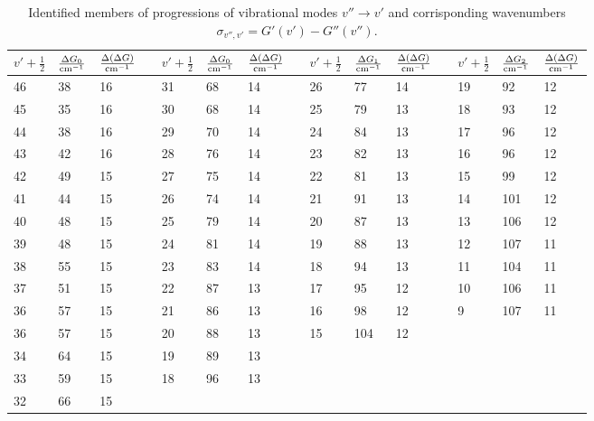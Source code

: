\begin{table}[h]
\centering
\footnotesize
\begin{tabular}{|l |l |l ||c|
                 l |l |l ||c|
                 l |l |l ||c|
                 l |l |l |}
\hline
$v' + \frac{1}{2}$ & $\frac{\Delta G_{0} }{ \mathrm{cm^{-1}}} $ & $\frac{\Delta (\Delta G) }{ \mathrm{cm^{-1}}} $&&
$v' + \frac{1}{2}$ & $\frac{\Delta G_{0} }{ \mathrm{cm^{-1}}} $ & $\frac{\Delta (\Delta G) }{ \mathrm{cm^{-1}}} $&&
$v' + \frac{1}{2}$ & $\frac{\Delta G_{1} }{ \mathrm{cm^{-1}}} $ & $\frac{\Delta (\Delta G) }{ \mathrm{cm^{-1}}} $&&
$v' + \frac{1}{2}$ & $\frac{\Delta G_{2} }{ \mathrm{cm^{-1}}} $ & $\frac{\Delta (\Delta G) }{ \mathrm{cm^{-1}}} $\\ \hline
46 & 38 & 16 & & 31 & 68 & 14 & & 26 & 77 & 14 & & 19 & 92 & 12 \\ \hline
45 & 35 & 16 & & 30 & 68 & 14 & & 25 & 79 & 13 & & 18 & 93 & 12 \\ \hline
44 & 38 & 16 & & 29 & 70 & 14 & & 24 & 84 & 13 & & 17 & 96 & 12 \\ \hline
43 & 42 & 16 & & 28 & 76 & 14 & & 23 & 82 & 13 & & 16 & 96 & 12 \\ \hline
42 & 49 & 15 & & 27 & 75 & 14 & & 22 & 81 & 13 & & 15 & 99 & 12 \\ \hline
41 & 44 & 15 & & 26 & 74 & 14 & & 21 & 91 & 13 & & 14 & 101 & 12 \\ \hline
40 & 48 & 15 & & 25 & 79 & 14 & & 20 & 87 & 13 & & 13 & 106 & 12 \\ \hline
39 & 48 & 15 & & 24 & 81 & 14 & & 19 & 88 & 13 & & 12 & 107 & 11 \\ \hline
38 & 55 & 15 & & 23 & 83 & 14 & & 18 & 94 & 13 & & 11 & 104 & 11 \\ \hline
37 & 51 & 15 & & 22 & 87 & 13 & & 17 & 95 & 12 & & 10 & 106 & 11 \\ \hline
36 & 57 & 15 & & 21 & 86 & 13 & & 16 & 98 & 12 & & 9 & 107 & 11 \\ \hline
36 & 57 & 15 & & 20 & 88 & 13 & & 15 & 104 & 12 \\ \cline{1-11}
34 & 64 & 15 & & 19 & 89 & 13 \\ \cline{1-7}
33 & 59 & 15 & & 18 & 96 & 13 \\ \cline{1-7}
32 & 66 & 15 \\ \cline{1-3}
\end{tabular}
\caption{Identified members of progressions of vibrational modes $v'' \rightarrow v'$ 
and corrisponding wavenumbers $\sigma_{v'', v'} = G'(v') - G''(v'').$}
\label{tab:dG}
\end{table}

